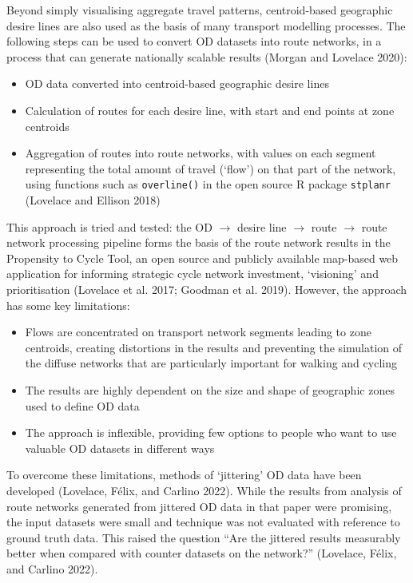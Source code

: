 \documentclass{isprs} %
\begin{document}
Beyond simply visualising aggregate travel patterns, centroid-based geographic desire lines are also used as the basis of many transport modelling processes.
The following steps can be used to convert OD datasets into route networks, in a process that can generate nationally scalable results (Morgan and Lovelace 2020):

\begin{itemize}
\item
  OD data converted into centroid-based geographic desire lines
\item
  Calculation of routes for each desire line, with start and end points at zone centroids
\item
  Aggregation of routes into route networks, with values on each segment representing the total amount of travel (`flow') on that part of the network, using functions such as \texttt{overline()} in the open source R package \texttt{stplanr} (Lovelace and Ellison 2018)
\end{itemize}

This approach is tried and tested:
the OD \(\rightarrow\) desire line \(\rightarrow\) route \(\rightarrow\) route network processing pipeline forms the basis of the route network results in the Propensity to Cycle Tool, an open source and publicly available map-based web application for informing strategic cycle network investment, `visioning' and prioritisation (Lovelace et al. 2017; Goodman et al. 2019).
However, the approach has some key limitations:

\begin{itemize}
\item
  Flows are concentrated on transport network segments leading to zone centroids, creating distortions in the results and preventing the simulation of the diffuse networks that are particularly important for walking and cycling
\item
  The results are highly dependent on the size and shape of geographic zones used to define OD data
\item
  The approach is inflexible, providing few options to people who want to use valuable OD datasets in different ways
\end{itemize}

To overcome these limitations, methods of `jittering' OD data have been developed (Lovelace, Félix, and Carlino 2022).
While the results from analysis of route networks generated from jittered OD data in that paper were promising, the input datasets were small and technique was not evaluated with reference to ground truth data.
This raised the question ``Are the jittered results measurably better when compared with counter datasets on the network?'' (Lovelace, Félix, and Carlino 2022).
\end{document}
